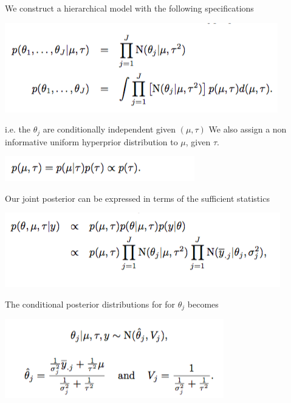 \documentclass[a4paper, 9pt]{article}
\begin{document}
We construct a hierarchical model with the following specifications 

\begin{center}
\includegraphics[scale = 0.5]{spec1.png}
\end{center}
i.e. the $\theta_j$ are conditionally independent given $(\mu, \tau)$ We also assign a non informative uniform hyperprior distribution to $\mu$, given $\tau$.
\begin{center}
    \includegraphics[scale = 0.52]{spec2.png}
\end{center}

Our joint posterior can be expressed in terms of the sufficient statistics

\begin{center}
    \includegraphics[scale = 0.5]{spec3.png}
\end{center}

The conditional posterior distributions for for $\theta_j$ becomes 
\begin{center}
     \includegraphics[scale = 0.5]{spec4.png}
\end{center}
\end{document}
